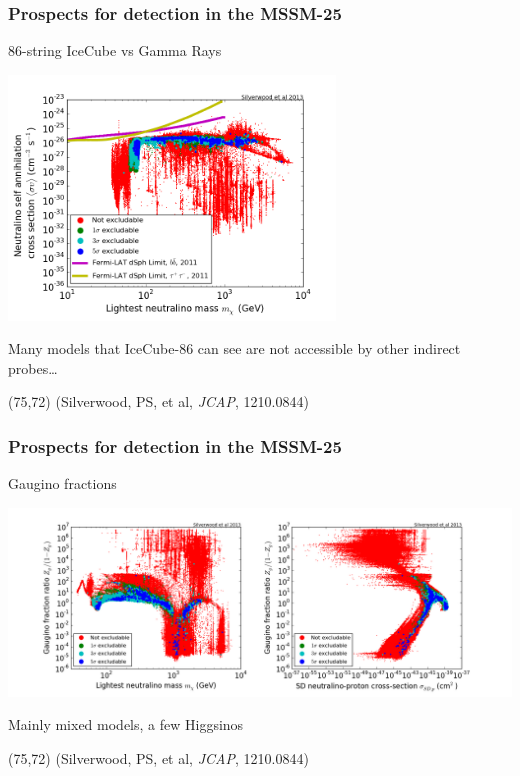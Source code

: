\documentclass[xcolor=dvipsnames]{beamer}
\begin{document}
\begin{frame}
\frametitle{Prospects for detection in the MSSM-25}
86-string IceCube vs Gamma Rays

\begin{center}
\includegraphics[width=0.65\textwidth]{MSSM25_ID}
\end{center}

Many models that IceCube-86 can see are not accessible by other indirect probes\ldots

\begin{textblock}{80}(75,72)
  {\tiny(Silverwood, PS, et al, \textit{JCAP}, 1210.0844)}
\end{textblock}

\end{frame}

\begin{frame}
\frametitle{Prospects for detection in the MSSM-25}
Gaugino fractions
\vspace{3mm}

\includegraphics[width=1.1\textwidth, trim = 50 0 0 0, clip=true]{MSSM25_Gaugino}

\vspace{3mm}
Mainly mixed models, a few Higgsinos

\begin{textblock}{80}(75,72)
  {\tiny(Silverwood, PS, et al, \textit{JCAP}, 1210.0844)}
\end{textblock}

\end{frame}
\end{document}
